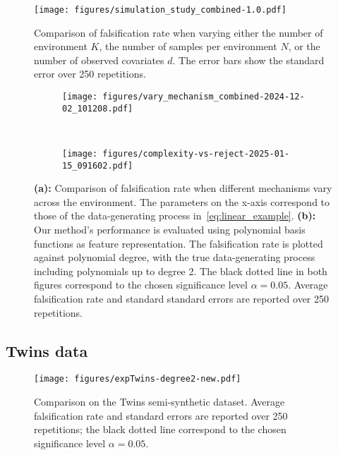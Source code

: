 \documentclass{article}
\begin{document}
\begin{figure}[t]
    \centering
    \texttt{[image: figures/simulation\_study\_combined-1.0.pdf]}
    \caption{Comparison of falsification rate  when varying either the number of environment $K$, the number of samples per environment $N$, or the number of observed covariates $d$. The error bars show the standard error over 250 repetitions.}
    \label{fig:combined_study}
\end{figure}
\begin{figure}[t]
    \centering
    \begin{subfigure}{0.6\textwidth}
         \centering
         \texttt{[image: figures/vary\_mechanism\_combined-2024-12-02\_101208.pdf]}
          \caption{}
          \label{fig:vary_mechanism}
     \end{subfigure}
     ~
     \begin{subfigure}{0.26\textwidth}
         \centering
          \texttt{[image: figures/complexity-vs-reject-2025-01-15\_091602.pdf]}
          \caption{}
        \label{fig:detection_vs_complexity}
     \end{subfigure}
    \caption{\textbf{(a):} Comparison of falsification rate when different mechanisms vary across the environment. The parameters on the x-axis correspond to those of the data-generating process in~\eqref{eq:linear_example}. \textbf{(b):} Our method's performance is evaluated using polynomial basis functions as feature representation. The falsification rate is plotted against polynomial degree, with the true data-generating process including polynomials up to degree 2. The black dotted line in both figures correspond to the chosen significance level $\alpha=0.05$. Average falsification rate and standard standard errors are reported over 250 repetitions. }
    \label{fig:vary_mechanism-detection_vs_complexituy}
\end{figure}

\subsection{Twins data}

\begin{figure}[t]
     \centering
     \texttt{[image: figures/expTwins-degree2-new.pdf]}
     \caption{Comparison on the Twins semi-synthetic dataset. Average falsification rate and standard errors are reported over 250 repetitions; the black dotted line correspond to the chosen significance level $\alpha=0.05$.}
     \label{fig:twins_experiment}
\end{figure}
\end{document}
